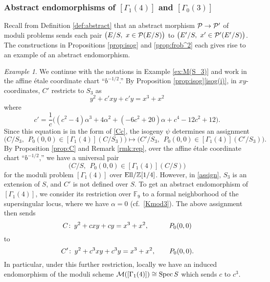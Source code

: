 \documentclass{gtpart}
\theoremstyle{definition}
\theoremstyle{remark}
\newtheorem{ex}[thm]{Example}
\def\co{\colon\thinspace}
\newcommand{\mb}[1]{\mathbb{#1}}
\newcommand{\Spec}{{\rm Spec\thinspace}}
\newcommand{\Ell}{{\rm Ell}}
\newcommand{\CM}{{\cal M}}
\newcommand{\CP}{{\cal P}}
\newcommand{\BF}{{\mb F}}
\newcommand{\BZ}{{\mb Z}}
\newcommand{\A}{\alpha}
\newcommand{\G}{\Gamma}
\newcommand{\isog}[1]{Proposition \ref{prop:isog}\thinspace \eqref{isog(#1)}}
\numberwithin{equation}{section}
\numberwithin{thm}{section}
\begin{document}
\subsubsection*{Abstract endomorphisms of $[\G_1(4)]$ and $[\G_0(3)]$}

Recall from Definition \ref{def:abstract} that an abstract morphism 
$\CP \to \CP'$ of moduli problems sends each pair 
$\big( E/S, ~ x \in \CP(E/S) \big)$ to 
$\big( E'/S, ~ x' \in \CP'(E'/S) \big)$.  The constructions in 
Propositions \ref{prop:isog} and \ref{prop:frob^2} each gives rise to an 
example of an abstract endomorphism.  

\begin{ex}
\label{ex:ab4}
 We continue with the notations in Example \ref{ex:M(S_3)} and work in 
 the affine \'etale coordinate chart ``$b^{-1/2}$.''  By \isog{i}, in 
 $xy$-coordinates, $C'$ restricts to $S_3$ as 
 \[
  y^2 + c' x y + c' y = x^3 + x^2 
 \]
 where 
 \[
  c' = \frac{1}{c} \big( (c^2 - 4) \A^3 + 4 \A^2 + (-6 c^2 + 20) \A 
  + c^4 - 12 c^2 + 12 \big).  
 \]
 Since this equation is in the form of \eqref{Cc}, the isogeny $\psi$ 
 determines an assignment 
 \begin{equation}
 \label{assign}
  \big( C/S_3, ~~ P_0(0,0) \in [\G_1(4)](C/S_3) \big) \longmapsto 
  \big( C'/S_3, ~~ P_0(0,0) \in [\G_1(4)](C'/S_3) \big).  
 \end{equation}
 By Proposition \ref{prop:C} and Remark \ref{rmk:rep}, over the affine 
 \'etale coordinate chart ``$b^{-1/2}$,'' we have a universal pair 
 \[
  \big( C/S, ~~ P_0(0,0) \in [\G_1(4)](C/S) \big) 
 \]
 for the moduli problem $[\G_1(4)]$ over $\Ell/\BZ[1/4]$.  However, in 
 \eqref{assign}, $S_3$ is an extension of $S$, and $C'$ is not defined 
 over $S$.  To get an abstract endomorphism of $[\G_1(4)]$, we consider 
 its restriction over $\BF_9$ to a formal neighborhood of the 
 supersingular locus, where we have $\A = 0$ (cf.~\eqref{Kmod3}).  The 
 above assignment then sends 
 \[
  C \co y^2 + c x y + c y = x^3 + x^2, \qquad ~~~ P_0(0,0) 
 \]
 to 
 \[
  \thinspace C' \co y^2 + c^3 x y + c^3 y = x^3 + x^2, \qquad P_0(0,0).  
 \]
 In particular, under this further restriction, locally we have an 
 induced endomorphism of the moduli scheme 
 $\CM([\G_1(4)]) \cong \Spec S$ which sends $c$ to $c^3$.  
\end{ex}
\end{document}
